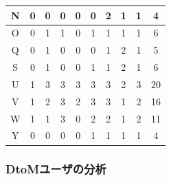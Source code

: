 \documentclass[submit,ses,noauthor]{ipsj}
\begin{document}
\begin{table}[h]
\begin{minipage}[t]{0.55\linewidth}
\begin{tabular}{c|c|cccccccc}
N                   & 0                                           & \multicolumn{1}{c|}{0} & \multicolumn{1}{c|}{0} & \multicolumn{1}{c|}{0} & \multicolumn{1}{c|}{0} & \multicolumn{1}{c|}{2} & \multicolumn{1}{c|}{1} & \multicolumn{1}{c|}{1} & 4  \\ \hline
O                   & 0                                           & \multicolumn{1}{c|}{1} & \multicolumn{1}{c|}{1} & \multicolumn{1}{c|}{0} & \multicolumn{1}{c|}{1} & \multicolumn{1}{c|}{1} & \multicolumn{1}{c|}{1} & \multicolumn{1}{c|}{1} & 6  \\ \hline
Q                   & 0                                           & \multicolumn{1}{c|}{1} & \multicolumn{1}{c|}{0} & \multicolumn{1}{c|}{0} & \multicolumn{1}{c|}{0} & \multicolumn{1}{c|}{1} & \multicolumn{1}{c|}{2} & \multicolumn{1}{c|}{1} & 5  \\ \hline
S                   & 0                                           & \multicolumn{1}{c|}{1} & \multicolumn{1}{c|}{0} & \multicolumn{1}{c|}{0} & \multicolumn{1}{c|}{1} & \multicolumn{1}{c|}{1} & \multicolumn{1}{c|}{2} & \multicolumn{1}{c|}{1} & 6  \\ \hline
U                   & 1                                           & \multicolumn{1}{c|}{3} & \multicolumn{1}{c|}{3} & \multicolumn{1}{c|}{3} & \multicolumn{1}{c|}{3} & \multicolumn{1}{c|}{3} & \multicolumn{1}{c|}{2} & \multicolumn{1}{c|}{3} & 20 \\ \hline
V                   & 1                                           & \multicolumn{1}{c|}{2} & \multicolumn{1}{c|}{3} & \multicolumn{1}{c|}{2} & \multicolumn{1}{c|}{3} & \multicolumn{1}{c|}{3} & \multicolumn{1}{c|}{1} & \multicolumn{1}{c|}{2} & 16 \\ \hline
W                   & 1                                           & \multicolumn{1}{c|}{1} & \multicolumn{1}{c|}{3} & \multicolumn{1}{c|}{0} & \multicolumn{1}{c|}{2} & \multicolumn{1}{c|}{2} & \multicolumn{1}{c|}{1} & \multicolumn{1}{c|}{2} & 11 \\ \hline
Y                   & 0                                           & \multicolumn{1}{c|}{0} & \multicolumn{1}{c|}{0} & \multicolumn{1}{c|}{0} & \multicolumn{1}{c|}{1} & \multicolumn{1}{c|}{1} & \multicolumn{1}{c|}{1} & \multicolumn{1}{c|}{1} & 4  \\ \hline
\end{tabular}
  \end{minipage}
\end{table}

\subsubsection*{DtoMユーザの分析}
\end{document}
